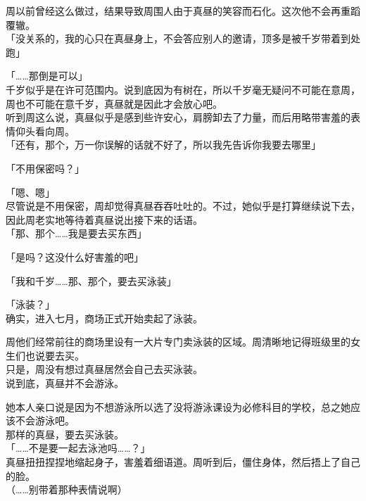 周以前曾经这么做过，结果导致周围人由于真昼的笑容而石化。这次他不会再重蹈覆辙。\\

「没关系的，我的心只在真昼身上，不会答应别人的邀请，顶多是被千岁带着到处跑」

「……那倒是可以」\\

千岁似乎是在许可范围内。说到底因为有树在，所以千岁毫无疑问不可能在意周，周也不可能在意千岁，真昼就是因此才会放心吧。\\

听到周这么说，真昼似乎是感到些许安心，肩膀卸去了力量，而后用略带害羞的表情仰头看向周。\\

「还有，那个，万一你误解的话就不好了，所以我先告诉你我要去哪里」

「不用保密吗？」

「嗯、嗯」\\

尽管说是不用保密，周却觉得真昼吞吞吐吐的。不过，她似乎是打算继续说下去，因此周老实地等待着真昼说出接下来的话语。\\

「那、那个……我是要去买东西」

「是吗？这没什么好害羞的吧」

「我和千岁……那、那个，要去买泳装」

「泳装？」\\

确实，进入七月，商场正式开始卖起了泳装。

周他们经常前往的商场里设有一大片专门卖泳装的区域。周清晰地记得班级里的女生们也说要去买。\\

只是，周没有想过真昼居然会自己去买泳装。\\

说到底，真昼并不会游泳。

她本人亲口说是因为不想游泳所以选了没将游泳课设为必修科目的学校，总之她应该不会游泳吧。\\

那样的真昼，要去买泳装。\\

「……不是要一起去泳池吗……？」\\

真昼扭扭捏捏地缩起身子，害羞着细语道。周听到后，僵住身体，然后捂上了自己的脸。\\

（……别带着那种表情说啊）\\

